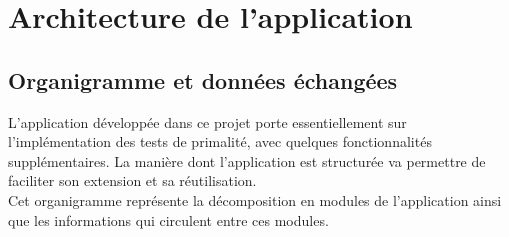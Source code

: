 \section{Architecture de l'application}

	\subsection{Organigramme et données échangées}
	L'application développée dans ce projet porte essentiellement sur l'implémentation des tests de primalité, avec quelques fonctionnalités supplémentaires. La manière dont l'application est structurée va permettre de faciliter son extension et sa réutilisation.\\
	\indent Cet organigramme représente la décomposition en modules de l'application ainsi que les informations qui circulent entre ces modules.
